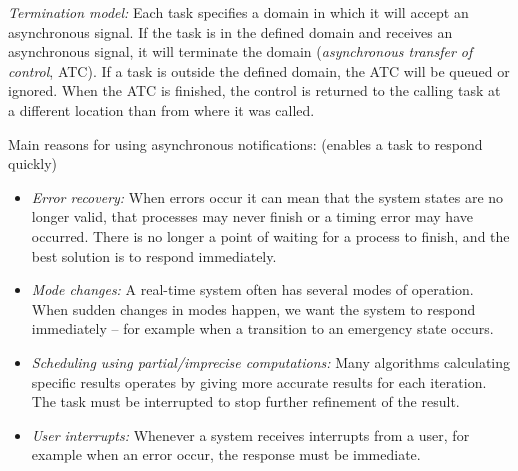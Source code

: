 \textit{Termination model:} Each task specifies a domain in which it will accept an asynchronous signal. If the task is in the defined domain and receives an asynchronous signal, it will terminate the domain (\textit{asynchronous transfer of control}, ATC). If a task is outside the defined domain, the ATC will be queued or ignored. When the ATC is finished, the control is returned to the calling task at a different location than from where it was called.

Main reasons for using asynchronous notifications: (enables a task to respond quickly)
\begin{itemize}
  \item \textit{Error recovery:} When errors occur it can mean that the system states are no longer valid, that processes may never finish or a timing error may have occurred. There is no longer a point of waiting for a process to finish, and the best solution is to respond immediately.
  \item \textit{Mode changes:} A real-time system often has several modes of operation. When sudden changes in modes happen, we want the system to respond immediately -- for example when a transition to an emergency state occurs.
  \item \textit{Scheduling using partial/imprecise computations:} Many algorithms calculating specific results operates by giving more accurate results for each iteration. The task must be interrupted to stop further refinement of the result.
  \item \textit{User interrupts:} Whenever a system receives interrupts from a user, for example when an error occur, the response must be immediate.
\end{itemize}




